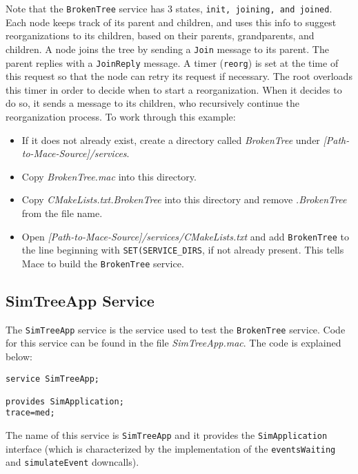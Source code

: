 \documentclass[12pt,letterpaper]{article}
\newenvironment{code}
{\begin{list}{}{\setlength{\leftmargin}{1em}}\item\scriptsize\bfseries}
{\end{list}}
\begin{document}
Note that the \texttt{BrokenTree} service has 3 states, \texttt{init, joining, and joined}.  Each node keeps track of its parent and children, and uses this info to suggest reorganizations to its children, based on their parents, grandparents, and children.  A node joins the tree by sending a \texttt{Join} message to its parent.  The parent replies with a \texttt{JoinReply} message.  A timer (\texttt{reorg}) is set at the time of this request so that the node can retry its request if necessary.  The root overloads this timer in order to decide when to start a reorganization.  When it decides to do so, it sends a message to its children, who recursively continue the reorganization process.
To work through this example:
\begin{itemize} 
\item If it does not already exist, create a directory called \emph{BrokenTree} under \emph{[Path-to-Mace-Source]/services}.  
\item Copy \emph{BrokenTree.mac} into this directory.  
\item Copy \emph{CMakeLists.txt.BrokenTree} into this directory and remove \emph{.BrokenTree} from the file name.
\item Open \emph{[Path-to-Mace-Source]/services/CMakeLists.txt} and add \texttt{BrokenTree} to the line beginning with \texttt{SET(SERVICE\_DIRS}, if not already present.  This tells Mace to build the \texttt{BrokenTree} service.
\end{itemize}

\subsection{SimTreeApp Service} 
\label{SimTreeApp Service}
The \texttt{SimTreeApp} service is the service used to test the \texttt{BrokenTree} service.  Code for this service can be found in the file \emph{SimTreeApp.mac}.  The code is explained below:

\begin{code}
\begin{verbatim}
service SimTreeApp;

provides SimApplication;
trace=med;
\end{verbatim}
\end{code}

The name of this service is \texttt{SimTreeApp} and it provides the \texttt{SimApplication} interface (which is characterized by the implementation of the \texttt{eventsWaiting} and \texttt{simulateEvent} downcalls).  
\end{document}
